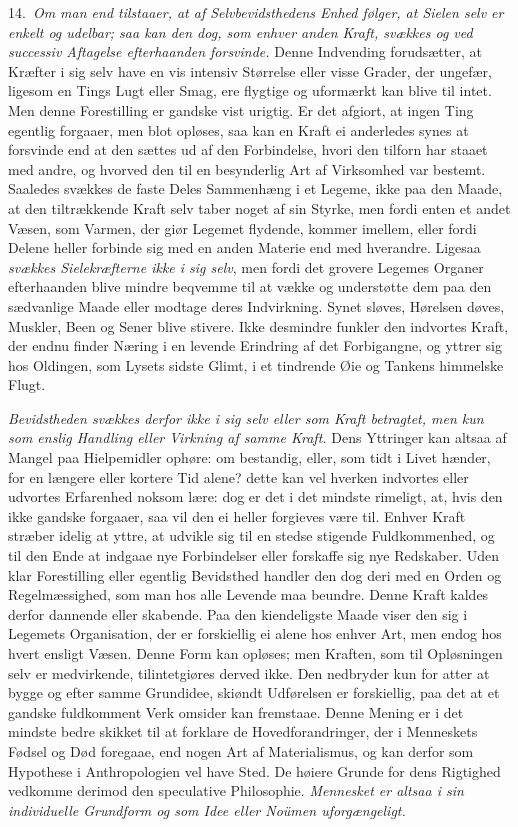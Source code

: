 \documentclass[12pt,a4paper]{article}
\newcommand{\opage}[1]{\marginnote{\footnotesize\textit{[#1]}}}
\begin{document}
14.~\emph{Om man end tilstaaer, at af Selvbevidsthedens Enhed følger, at Sielen
selv er enkelt og udelbar; saa kan den dog, som enhver anden Kraft, svækkes og ved
successiv Aftagelse efterhaanden forsvinde.} Denne Indvending forudsætter, at
Kræfter i sig selv have en vis intensiv Størrelse eller visse Grader, der ungefær,
ligesom en Tings Lugt eller Smag, ere flygtige og uformærkt kan blive til intet.
Men denne Forestilling er gandske vist urigtig. Er det afgiort, at ingen Ting
egentlig forgaaer, men blot opløses, saa kan en Kraft ei anderledes synes at
forsvinde end at den sættes ud af den Forbindelse, hvori den tilforn har staaet
med andre, og hvorved den til en besynderlig Art af Virksomhed var bestemt.
Saaledes svækkes de faste Deles Sammenhæng i et Legeme, ikke paa den Maade, at den
tiltrækkende Kraft selv taber noget af sin Styrke, men fordi enten et andet Væsen,
som Varmen, der giør Legemet flydende, kommer imellem, eller fordi Delene heller
forbinde sig med en anden Materie end med hverandre. Ligesaa
\opage{26} \emph{svækkes Sielekræfterne ikke i sig selv}, men fordi det grovere Legemes
Organer efterhaanden blive mindre beqvemme til at vække og understøtte dem paa den
sædvanlige Maade eller modtage deres Indvirkning. Synet sløves, Hørelsen døves,
Muskler, Been og Sener blive stivere. Ikke desmindre funkler den indvortes Kraft,
der endnu finder Næring i en levende Erindring af det Forbigangne, og yttrer sig
hos Oldingen, som Lysets sidste Glimt, i et tindrende Øie og Tankens himmelske
Flugt.

\emph{Bevidstheden svækkes derfor ikke i sig selv eller som Kraft betragtet, men
kun som enslig Handling eller Virkning af samme Kraft.} Dens Yttringer kan altsaa
af Mangel paa Hielpemidler ophøre: om bestandig, eller, som tidt i Livet hænder,
for en længere eller kortere Tid alene? dette kan vel hverken indvortes eller
udvortes Erfarenhed noksom lære: dog er det i det mindste rimeligt, at, hvis den
ikke gandske forgaaer, saa vil den ei heller forgieves være til. Enhver Kraft
stræber idelig at yttre, at udvikle sig til en stedse stigende Fuldkommenhed, og
til den Ende at indgaae nye Forbindelser eller forskaffe sig nye Redskaber. Uden
klar Forestilling eller egentlig Bevidsthed handler den dog deri med en Orden og
Regelmæssighed, som man hos alle Levende maa beundre. Denne Kraft kaldes derfor
dannende eller skabende. Paa den kiendeligste Maade viser den
\opage{27} sig i Legemets Organisation, der er forskiellig ei alene hos enhver Art, men endog
hos hvert ensligt Væsen. Denne Form kan opløses; men Kraften, som til Opløsningen
selv er medvirkende, tilintetgiøres derved ikke. Den nedbryder kun for atter at
bygge og efter samme Grundidee, skiøndt Udførelsen er forskiellig, paa det at et
gandske fuldkomment Verk omsider kan fremstaae. Denne Mening er i det mindste
bedre skikket til at forklare de Hovedforandringer, der i Menneskets Fødsel og Død
foregaae, end nogen Art af Materialismus, og kan derfor som Hypothese i
Anthropologien vel have Sted. De høiere Grunde for dens Rigtighed vedkomme
derimod den speculative Philosophie. \emph{Mennesket er altsaa i sin individuelle
Grundform og som Idee eller Noümen uforgængeligt.}
\end{document}
